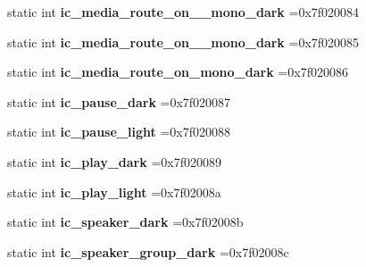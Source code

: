 \begin{DoxyCompactItemize}
static int {\bfseries ic\+\_\+media\+\_\+route\+\_\+on\+\_\+\_\+mono\+\_\+dark} =0x7f020084
\item 
\mbox{\label{classandroid_1_1support_1_1v4_1_1R_1_1drawable_a114d02da14fdc5103b8c76f57bd26eac}} 
static int {\bfseries ic\+\_\+media\+\_\+route\+\_\+on\+\_\+\_\+mono\+\_\+dark} =0x7f020085
\item 
\mbox{\label{classandroid_1_1support_1_1v4_1_1R_1_1drawable_a76b2bc02307fcf73735ab903c784dddb}} 
static int {\bfseries ic\+\_\+media\+\_\+route\+\_\+on\+\_\+mono\+\_\+dark} =0x7f020086
\item 
\mbox{\label{classandroid_1_1support_1_1v4_1_1R_1_1drawable_a193846ab9fb551bce43f9d594b8ee859}} 
static int {\bfseries ic\+\_\+pause\+\_\+dark} =0x7f020087
\item 
\mbox{\label{classandroid_1_1support_1_1v4_1_1R_1_1drawable_a212223543b152966582c07eba081708a}} 
static int {\bfseries ic\+\_\+pause\+\_\+light} =0x7f020088
\item 
\mbox{\label{classandroid_1_1support_1_1v4_1_1R_1_1drawable_a9237be66cc2ea8b95632d03b89321d5a}} 
static int {\bfseries ic\+\_\+play\+\_\+dark} =0x7f020089
\item 
\mbox{\label{classandroid_1_1support_1_1v4_1_1R_1_1drawable_a2f4eb4fa16d0c937120f71550a45b31c}} 
static int {\bfseries ic\+\_\+play\+\_\+light} =0x7f02008a
\item 
\mbox{\label{classandroid_1_1support_1_1v4_1_1R_1_1drawable_ae45ee1b0a78b64461e4d5bc08e1b9105}} 
static int {\bfseries ic\+\_\+speaker\+\_\+dark} =0x7f02008b
\item 
\mbox{\label{classandroid_1_1support_1_1v4_1_1R_1_1drawable_a4091dc6107a448c9680499b49b036b22}} 
static int {\bfseries ic\+\_\+speaker\+\_\+group\+\_\+dark} =0x7f02008c
\item 
\mbox{\label{classandroid_1_1support_1_1v4_1_1R_1_1drawable_a60b8217307550d2b1181e9f651a15a8e}} 

\end{DoxyCompactItemize}
